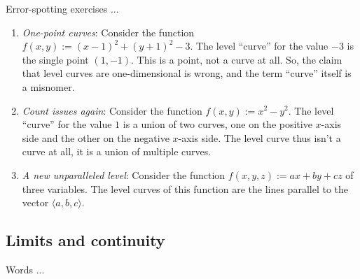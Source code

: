 \documentclass[10pt]{amsart}
\begin{document}
Error-spotting exercises ...

\begin{enumerate}
\item {\em One-point curves}: Consider the function $f(x,y) := (x -
  1)^2 + (y + 1)^2 - 3$. The level ``curve'' for the value $-3$ is the
  single point $(1,-1)$. This is a point, not a curve at all. So, the
  claim that level curves are one-dimensional is wrong, and the term
  ``curve'' itself is a misnomer.
\item {\em Count issues again}: Consider the function $f(x,y) := x^2 -
  y^2$. The level ``curve'' for the value $1$ is a union of two
  curves, one on the positive $x$-axis side and the other on the
  negative $x$-axis side. The level curve thus isn't a curve at all,
  it is a union of multiple curves.
\item {\em A new unparalleled level}: Consider the function $f(x,y,z) :=
  ax + by + cz$ of three variables. The level curves of this function
  are the lines parallel to the vector $\langle a,b,c \rangle$.
\end{enumerate}

\subsection{Limits and continuity}

Words ...
\end{document}
